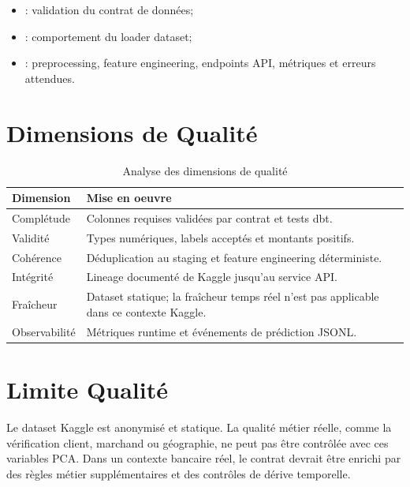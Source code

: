 \begin{itemize}
    \item {}: validation du contrat de données;
    \item {}: comportement du loader dataset;
    \item {}: preprocessing, feature engineering, endpoints API, métriques et erreurs attendues.
\end{itemize}

\section{Dimensions de Qualité}

\begin{table}[htbp]
\centering
\caption{Analyse des dimensions de qualité}
\begin{tabularx}{\textwidth}{p{}X}
\toprule
Dimension & Mise en oeuvre\\
\midrule
Complétude & Colonnes requises validées par contrat et tests dbt.\\
Validité & Types numériques, labels acceptés et montants positifs.\\
Cohérence & Déduplication au staging et feature engineering déterministe.\\
Intégrité & Lineage documenté de Kaggle jusqu'au service API.\\
Fraîcheur & Dataset statique; la fraîcheur temps réel n'est pas applicable dans ce contexte Kaggle.\\
Observabilité & Métriques runtime et événements de prédiction JSONL.\\
\bottomrule
\end{tabularx}
\end{table}

\section{Limite Qualité}

Le dataset Kaggle est anonymisé et statique. La qualité métier réelle, comme la vérification client, marchand ou géographie, ne peut pas être contrôlée avec ces variables PCA. Dans un contexte bancaire réel, le contrat devrait être enrichi par des règles métier supplémentaires et des contrôles de dérive temporelle.

